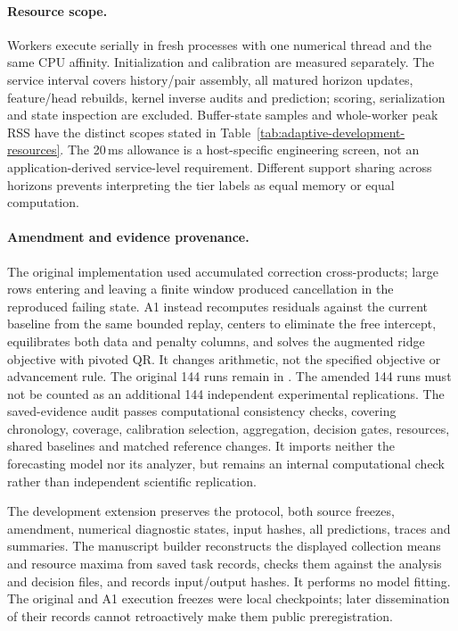 \paragraph{Resource scope.}
Workers execute serially in fresh processes with one numerical thread and
the same CPU affinity. Initialization and calibration are measured
separately. The service interval covers history/pair assembly, all matured
horizon updates, feature/head rebuilds, kernel inverse audits and prediction;
scoring, serialization and state inspection are excluded. Buffer-state
samples and whole-worker peak RSS have the distinct scopes stated in
Table~\ref{tab:adaptive-development-resources}. The 20\,ms allowance is a
host-specific engineering screen, not an application-derived service-level
requirement. Different support sharing across horizons prevents interpreting
the tier labels as equal memory or equal computation.

\paragraph{Amendment and evidence provenance.}
The original implementation used accumulated correction cross-products;
large rows entering and leaving a finite window produced cancellation in
the reproduced failing state. A1 instead recomputes residuals against the
current baseline from the same bounded replay, centers to eliminate the
free intercept, equilibrates both data and penalty columns, and solves
the augmented ridge objective with pivoted QR. It changes arithmetic, not
the specified objective or advancement rule. The original 144 runs remain
in .
The amended 144 runs must not be counted as an additional 144 independent
experimental replications. The saved-evidence audit passes
\ADAuditChecks{} computational consistency checks, covering chronology,
coverage, calibration selection, aggregation, decision gates, resources,
shared baselines and matched reference changes. It imports neither the
forecasting model nor its analyzer, but remains an internal computational
check rather than independent scientific replication.

The development extension preserves the protocol, both source freezes,
amendment, numerical diagnostic states, input hashes, all predictions,
traces and summaries. The manuscript builder
 reconstructs
the displayed collection means and resource maxima from saved task
records, checks them against the analysis and decision files, and records
input/output hashes. It performs no model fitting. The original and A1
execution freezes were local checkpoints; later dissemination of their
records cannot retroactively make them public preregistration.
